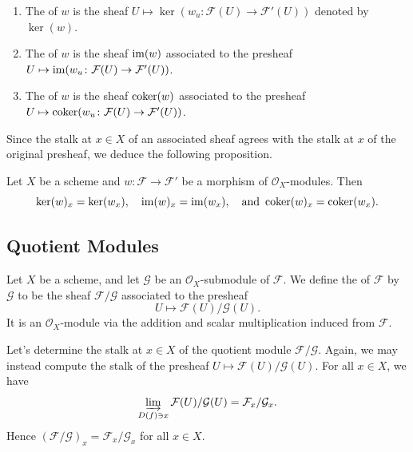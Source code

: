 \begin{enumerate}
	\item The  of $w$ is the sheaf $U \mapsto \ker(w_u \colon \mathcal{F}(U) \to \mathcal{F}'(U))$ denoted by $\ker(w)$.
	
	\item The  of $w$ is the sheaf $\operatorname{im}(w)$ associated to the presheaf $U \mapsto \operatorname{im}(w_u \colon \mathcal{F}(U) \to \mathcal{F}'(U))$.
	
	\item The  of $w$ is the sheaf $\operatorname{coker}(w)$ associated to the presheaf $U \mapsto \operatorname{coker}(w_u \colon \mathcal{F}(U) \to \mathcal{F}'(U))$.
\end{enumerate}

Since the stalk at $x \in X$ of an associated sheaf agrees with the stalk at $x$ of the original presheaf, we deduce the following proposition.

\begin{proposition}
	Let $X$ be a scheme and $w \colon \mathcal{F} \to \mathcal{F}'$ be a morphism of $\mathcal{O}_X$-modules. Then
	\begin{equation*}
		\ker(w)_x = \ker(w_x), \quad \operatorname{im}(w)_x = \operatorname{im}(w_x), \quad\text{and } \operatorname{coker}(w)_x = \operatorname{coker}(w_x).
	\end{equation*}
\end{proposition} 

\subsection*{Quotient Modules}

Let $X$ be a scheme, and let $\mathcal{G}$ be an $\mathcal{O}_X$-submodule of $\mathcal{F}$. We define the  of $\mathcal{F}$ by $\mathcal{G}$ to be the sheaf $\mathcal{F}/\mathcal{G}$ associated to the presheaf
\begin{equation*}
	U \mapsto \mathcal{F}(U)/\mathcal{G}(U).
\end{equation*}
It is an $\mathcal{O}_X$-module via the addition and scalar multiplication induced from $\mathcal{F}$.

Let's determine the stalk at $x \in X$ of the quotient module $\mathcal{F}/\mathcal{G}$. Again, we may instead compute the stalk of the presheaf $U \mapsto \mathcal{F}(U)/\mathcal{G}(U)$. For all $x \in X$, we have
\begin{equation*}
	\varinjlim_{D(f) \ni x} \mathcal{F}(U)/\mathcal{G}(U) = \mathcal{F}_x/\mathcal{G}_x.
\end{equation*}
Hence $(\mathcal{F}/\mathcal{G})_x = \mathcal{F}_x/\mathcal{G}_x$ for all $x \in X$.

